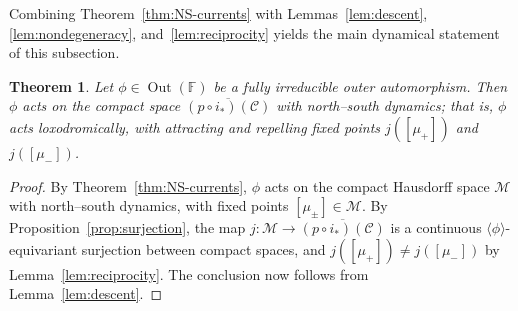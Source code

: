\documentclass[12pt,a4paper]{amsart}
\numberwithin{equation}{section}
\DeclareMathOperator{\Out}{Out}
\newcommand{\FF}{\mathbb{F}}
\theoremstyle{plain}
\newtheorem{theorem}{Theorem}[section]
\theoremstyle{definition}
\theoremstyle{remark}
\begin{document}
Combining Theorem~\ref{thm:NS-currents} with Lemmas~\ref{lem:descent}, \ref{lem:nondegeneracy}, and~\ref{lem:reciprocity} yields the main dynamical statement of this subsection.

\begin{theorem}\label{thm:loxodromic}
    Let $\phi \in \Out(\FF)$ be a fully irreducible outer automorphism.
    Then $\phi$ acts on the compact space $\overline{(p \circ i_*)(\mathcal{C})}$ with north–south dynamics; that is, $\phi$ acts loxodromically, with attracting and repelling fixed points $j([\mu_+])$ and $j([\mu_-])$.
\end{theorem}

\begin{proof}
    By Theorem~\ref{thm:NS-currents}, $\phi$ acts on the compact Hausdorff space $\mathcal{M}$ with north–south dynamics, with fixed points $[\mu_\pm] \in \mathcal{M}$.
    By Proposition~\ref{prop:surjection}, the map $j \colon \mathcal{M} \to \overline{(p \circ i_*)(\mathcal{C})}$ is a continuous $\langle\phi\rangle$-equivariant surjection between compact spaces, and $j([\mu_+]) \neq j([\mu_-])$ by Lemma~\ref{lem:reciprocity}.
    The conclusion now follows from Lemma~\ref{lem:descent}.
\end{proof}



\end{document}
